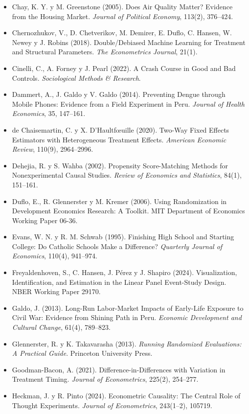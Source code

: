 \documentclass[11pt,a4paper]{article}
\begin{document}
{\begin{itemize}[leftmargin=1.4em,itemsep=1pt,label={}]
\item Chay, K. Y. y M. Greenstone (2005). Does Air Quality Matter? Evidence from the Housing Market. \emph{Journal of Political Economy}, 113(2), 376--424.
\item Chernozhukov, V., D. Chetverikov, M. Demirer, E. Duflo, C. Hansen, W. Newey y J. Robins (2018). Double/Debiased Machine Learning for Treatment and Structural Parameters. \emph{The Econometrics Journal}, 21(1).
\item Cinelli, C., A. Forney y J. Pearl (2022). A Crash Course in Good and Bad Controls. \emph{Sociological Methods \& Research}.
\item Dammert, A., J. Galdo y V. Galdo (2014). Preventing Dengue through Mobile Phones: Evidence from a Field Experiment in Peru. \emph{Journal of Health Economics}, 35, 147--161.
\item de Chaisemartin, C. y X. D'Haultfœuille (2020). Two-Way Fixed Effects Estimators with Heterogeneous Treatment Effects. \emph{American Economic Review}, 110(9), 2964--2996.
\item Dehejia, R. y S. Wahba (2002). Propensity Score-Matching Methods for Nonexperimental Causal Studies. \emph{Review of Economics and Statistics}, 84(1), 151--161.
\item Duflo, E., R. Glennerster y M. Kremer (2006). Using Randomization in Development Economics Research: A Toolkit. MIT Department of Economics Working Paper 06-36.
\item Evans, W. N. y R. M. Schwab (1995). Finishing High School and Starting College: Do Catholic Schools Make a Difference? \emph{Quarterly Journal of Economics}, 110(4), 941--974.
\item Freyaldenhoven, S., C. Hansen, J. Pérez y J. Shapiro (2024). Visualization, Identification, and Estimation in the Linear Panel Event-Study Design. NBER Working Paper 29170.
\item Galdo, J. (2013). Long-Run Labor-Market Impacts of Early-Life Exposure to Civil War: Evidence from Shining Path in Peru. \emph{Economic Development and Cultural Change}, 61(4), 789--823.
\item Glennerster, R. y K. Takavarasha (2013). \emph{Running Randomized Evaluations: A Practical Guide}. Princeton University Press.
\item Goodman-Bacon, A. (2021). Difference-in-Differences with Variation in Treatment Timing. \emph{Journal of Econometrics}, 225(2), 254--277.
\item Heckman, J. y R. Pinto (2024). Econometric Causality: The Central Role of Thought Experiments. \emph{Journal of Econometrics}, 243(1--2), 105719.

\end{itemize}}
\end{document}
